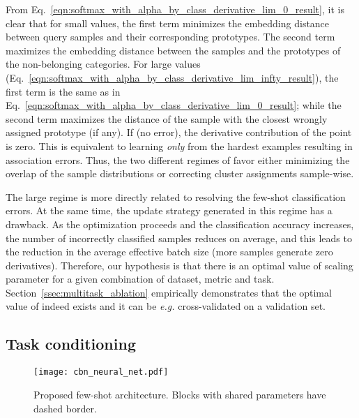 \documentclass{article}
\begin{document}
From Eq.~\eqref{eqn:softmax_with_alpha_by_class_derivative_lim_0_result}, it is clear that for small  values, the first term minimizes the embedding distance between query samples and their corresponding prototypes. The second term maximizes the embedding distance between the samples and the prototypes of the non-belonging categories. For large  values (Eq.~\eqref{eqn:softmax_with_alpha_by_class_derivative_lim_infty_result}), the first term is the same as in Eq.~\eqref{eqn:softmax_with_alpha_by_class_derivative_lim_0_result}; while the second term maximizes the distance of the sample with the closest wrongly assigned prototype  (if any). If  (no error), the derivative contribution of the point  is zero. This is equivalent to learning \emph{only} from the hardest examples resulting in association errors. Thus, the two different regimes of  favor either minimizing the overlap of the sample distributions or correcting cluster assignments sample-wise. 

The large  regime is more directly related to resolving the few-shot classification errors. At the same time, the update strategy generated in this regime has a drawback. As the optimization proceeds and the classification accuracy increases, the number of incorrectly classified samples reduces on average, and this leads to the reduction in the average effective batch size (more samples generate zero derivatives). Therefore, our hypothesis is that there is an optimal value of scaling parameter  for a given combination of dataset, metric and task. Section~\ref{ssec:multitask_ablation} empirically demonstrates that the optimal value of  indeed exists and it can be \emph{e.g.} cross-validated on a validation set.


\subsection{Task conditioning} \label{ssec:tbn_architechture}
\begin{figure}[t]
    \centering
\texttt{[image: cbn\_neural\_net.pdf]}
    \caption{Proposed few-shot architecture. Blocks with shared parameters have dashed border.}
    \label{fig:cbn_architecture}
\end{figure}
\end{document}
